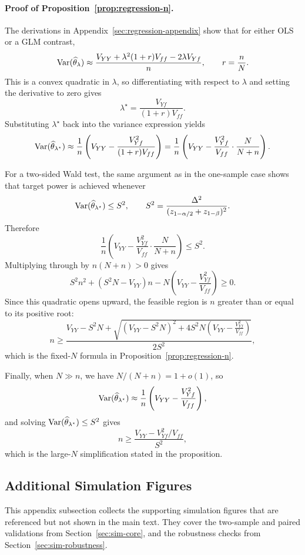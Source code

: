 
\paragraph{Proof of Proposition~\ref{prop:regression-n}.}
\label{sec:proof-regression-n}
The derivations in Appendix~\ref{sec:regression-appendix} show that for either
OLS or a GLM contrast,
\[
\mathrm{Var}(\widehat{\theta}_\lambda)
\approx
\frac{V_{YY} + \lambda^2(1+r)V_{ff} - 2\lambda V_{Yf}}{n},
\qquad
r=\frac{n}{N}.
\]
This is a convex quadratic in $\lambda$, so differentiating with respect to
$\lambda$ and setting the derivative to zero gives
\[
\lambda^\star
= \frac{V_{Yf}}{(1+r)V_{ff}}.
\]
Substituting $\lambda^\star$ back into the variance expression yields
\[
\mathrm{Var}(\widehat{\theta}_{\lambda^\star})
\approx
\frac{1}{n}\left(
V_{YY}
- \frac{V_{Yf}^2}{(1+r)V_{ff}}
\right)
=
\frac{1}{n}\left(
V_{YY}
- \frac{V_{Yf}^2}{V_{ff}}\cdot\frac{N}{N+n}
\right).
\]

For a two-sided Wald test, the same argument as in the one-sample case shows
that target power is achieved whenever
\[
\mathrm{Var}(\widehat{\theta}_{\lambda^\star}) \le S^2,
\qquad
S^2 = \frac{\Delta^2}{(z_{1-\alpha/2}+z_{1-\beta})^2}.
\]
Therefore
\[
\frac{1}{n}\left(
V_{YY}
- \frac{V_{Yf}^2}{V_{ff}}\cdot\frac{N}{N+n}
\right)\le S^2.
\]
Multiplying through by $n(N+n)>0$ gives
\[
S^2 n^2 + (S^2N - V_{YY})n - N\left(V_{YY}-\frac{V_{Yf}^2}{V_{ff}}\right)\ge 0.
\]
Since this quadratic opens upward, the feasible region is $n$ greater than or
equal to its positive root:
\[
n \ge
\frac{
V_{YY} - S^2N
+
\sqrt{(V_{YY}-S^2N)^2 + 4S^2N\left(V_{YY} - \frac{V_{Yf}^2}{V_{ff}}\right)}
}{2S^2},
\]
which is the fixed-$N$ formula in Proposition~\ref{prop:regression-n}.

Finally, when $N\gg n$, we have $N/(N+n)=1+o(1)$, so
\[
\mathrm{Var}(\widehat{\theta}_{\lambda^\star})
\approx
\frac{1}{n}\left(V_{YY}-\frac{V_{Yf}^2}{V_{ff}}\right),
\]
and solving $\mathrm{Var}(\widehat{\theta}_{\lambda^\star})\le S^2$ gives
\[
n \ge \frac{V_{YY}-V_{Yf}^2/V_{ff}}{S^2},
\]
which is the large-$N$ simplification stated in the proposition.

\subsection{Additional Simulation Figures}
\label{sec:supp-figures}

This appendix subsection collects the supporting simulation figures
that are referenced but not shown in the main text.  They cover the
two-sample and paired validations from Section~\ref{sec:sim-core},
and the robustness checks from Section~\ref{sec:sim-robustness}.

